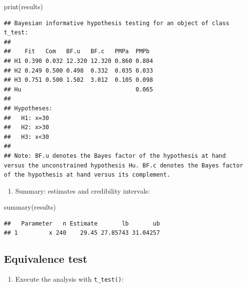 \documentclass[
]{book}
\newenvironment{Shaded}{\begin{snugshade}}{\end{snugshade}}
\newcommand{\FunctionTok}[1]{\textcolor[rgb]{0.00,0.00,0.00}{#1}}
\newcommand{\NormalTok}[1]{#1}
\providecommand{\tightlist}{%
  \setlength{\itemsep}{0pt}\setlength{\parskip}{0pt}}
\begin{document}
\begin{Shaded}
\begin{Highlighting}[]
\FunctionTok{print}\NormalTok{(results)}
\end{Highlighting}
\end{Shaded}

\begin{verbatim}
## Bayesian informative hypothesis testing for an object of class t_test:
## 
##    Fit   Com   BF.u   BF.c   PMPa  PMPb 
## H1 0.390 0.032 12.320 12.320 0.860 0.804
## H2 0.249 0.500 0.498  0.332  0.035 0.033
## H3 0.751 0.500 1.502  3.012  0.105 0.098
## Hu                                 0.065
## 
## Hypotheses:
##   H1: x=30
##   H2: x>30
##   H3: x<30
## 
## Note: BF.u denotes the Bayes factor of the hypothesis at hand versus the unconstrained hypothesis Hu. BF.c denotes the Bayes factor of the hypothesis at hand versus its complement.
\end{verbatim}

\begin{enumerate}
\def\labelenumi{\arabic{enumi})}
\setcounter{enumi}{3}
\tightlist
\item
  Summary: estimates and credibility intervals:
\end{enumerate}

\begin{Shaded}
\begin{Highlighting}[]
\FunctionTok{summary}\NormalTok{(results)}
\end{Highlighting}
\end{Shaded}

\begin{verbatim}
##   Parameter   n Estimate       lb       ub
## 1         x 240    29.45 27.85743 31.04257
\end{verbatim}

\hypertarget{equivalence-test}{%
\subsection{Equivalence test}\label{equivalence-test}}

\begin{enumerate}
\def\labelenumi{\arabic{enumi})}
\tightlist
\item
  Execute the analysis with \texttt{t\_test()}:
\end{enumerate}
\end{document}
